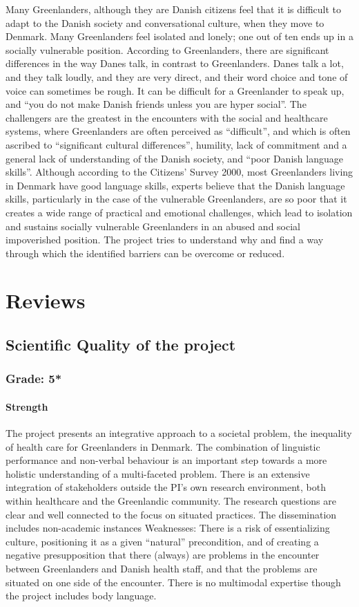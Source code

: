 \documentclass[twocolumn, issue, rga, authordate]{jote-new-article}
\begin{document}
Many Greenlanders, although they are Danish citizens feel that it is difficult to adapt to the Danish society and conversational culture, when they move to Denmark. Many Greenlanders feel isolated and lonely;
one out of ten ends up in a socially vulnerable position. According to Greenlanders, there are significant differences in the way Danes talk, in contrast to Greenlanders. Danes talk a lot, and they talk loudly, and they are very direct, and their word choice and tone of voice can sometimes be rough. It can be difficult for a Greenlander to speak up, and ``you do not make Danish friends unless you are hyper social''. The challengers are the greatest in the encounters with the social and healthcare systems, where Greenlanders are often perceived as
``difficult'', and which is often ascribed to ``significant cultural differences'', humility, lack of commitment and a general lack of understanding of the Danish society, and ``poor Danish language skills''. Although according to the Citizens' Survey 2000, most Greenlanders living in Denmark have good language skills, experts believe that the Danish language skills, particularly in the case of the vulnerable Greenlanders, are so poor that it creates a wide range of practical and emotional challenges, which lead to isolation and sustains socially vulnerable Greenlanders in an abused and social impoverished position. The project tries to understand why and find a way through which the identified barriers can be overcome or reduced.


\section{Reviews}


\subsection{Scientific Quality of the project}
\subsubsection{Grade: 5*}

\paragraph{Strength}
The project presents an integrative approach to a societal problem, the inequality of health care for Greenlanders in Denmark. The combination of linguistic performance and non-verbal behaviour is an important step towards a more holistic understanding of a multi-faceted problem. There is an extensive integration of stakeholders outside the PI's own research environment, both within healthcare and the Greenlandic community. The research questions are clear and well connected to the focus on situated practices. The dissemination includes non-academic instances Weaknesses: There is a risk of essentializing culture, positioning it as a given ``natural'' precondition, and of creating a negative presupposition that there (always) are problems in the encounter between Greenlanders and Danish health staff, and that the problems are situated on one side of the encounter. There is no multimodal expertise though the project includes body language.
\end{document}
